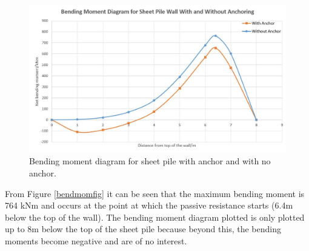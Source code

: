 \documentclass[12pt, a4paper]{article}
\begin{document}
\begin{figure}[H]
\centering
  	\includegraphics[width=0.6\textheight]{bmdiag}
   	\caption{Bending moment diagram for sheet pile with anchor and with no anchor.}
	\label{bendmomdiag}
\end{figure}
\begin{justify}
From Figure \ref{bendmomfig} it can be seen that the maximum bending moment is 764 kNm and occurs at the point at which the passive resistance starts (6.4m below the top of the wall). The bending moment diagram plotted is only plotted up to 8m below the top of the sheet pile because beyond this, the bending moments become negative and are of no interest.
\end{justify}
\end{document}
